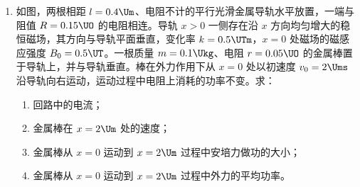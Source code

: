 \documentclass[\gkver]{gaokaozhenti}
\begin{document}
\begin{enumerate}
{（4）由动能定理有 $-q\Delta U'=0-\frac{1}{2}mv^{2}$，由题意 $\Delta U'=\frac{1}{2}E_{0}R$，得 $v=\sqrt{\frac{qE_{0}R}{m}}$。
}

\item
如图，两根相距 $l = 0.4\Um$、电阻不计的平行光滑金属导轨水平放置，一端与阻值 $R = 0.15\UO$ 的电阻相连。导轨 $x > 0$ 一侧存在沿 $x$ 方向均匀增大的稳恒磁场，其方向与导轨平面垂直，变化率 $k = 0.5\UTm$，$x = 0$ 处磁场的磁感应强度 $B_{0} = 0.5\UT$。一根质量 $m = 0.1\Ukg$、电阻 $r = 0.05\UO$ 的金属棒置于导轨上，并与导轨垂直。棒在外力作用下从 $x = 0$ 处以初速度 $v_{0} = 2\Ums$ 沿导轨向右运动，运动过程中电阻上消耗的功率不变。求：
\begin{enumerate}
	\item
	回路中的电流；
	\item
	金属棒在 $x = 2\Um$ 处的速度；
	\item
	金属棒从 $x = 0$ 运动到 $x = 2\Um$ 过程中安培力做功的大小；
	\item
	金属棒从 $x = 0$ 运动到 $x = 2\Um$ 过程中外力的平均功率。
\end{enumerate}
\onepicture[align=right, w=5.14cm]{}
\end{enumerate}
\end{document}

